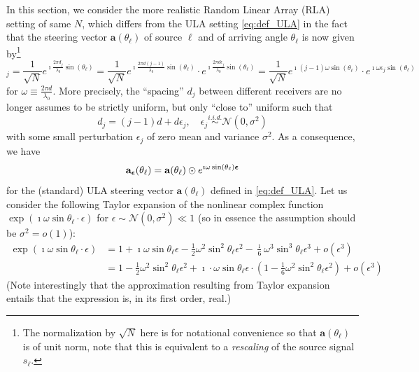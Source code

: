 \documentclass[11pt,a4paper]{article}
\begin{document}
In this section, we consider the more realistic Random Linear Array (RLA) setting of same $N$, which differs from the ULA setting \eqref{eq:def_ULA} in the fact that the steering vector $\mathbf{a}(\theta_\ell)$ of source $\ell$ and of arriving angle $\theta_\ell$ is now given by\footnote{The normalization by $\sqrt N$ here is for notational convenience so that $\mathbf{a}(\theta_\ell)$ is of unit norm, note that this is equivalent to a \emph{rescaling} of the source signal $s_\ell$.}
\begin{equation}
	[\mathbf{a}_{\bepsilon}(\theta_\ell)]_j = \frac1{\sqrt N} e^{\imath \frac{2\pi d_j}{\lambda_0} \sin(\theta_\ell)} = \frac1{\sqrt N} e^{\imath \frac{2\pi d (j-1)}{\lambda_0} \sin(\theta_\ell)} \cdot e^{\imath \frac{2\pi d \epsilon_j}{\lambda_0} \sin(\theta_\ell)} = \frac1{\sqrt N} e^{\imath (j-1) \omega \sin(\theta_\ell)} \cdot e^{\imath \omega \epsilon_j \sin(\theta_\ell)}
\end{equation}
for $\omega \equiv \frac{2 \pi d }{\lambda_0}$.
More precisely, the ``spacing'' $d_j$ between different receivers are no longer assumes to be strictly uniform, but only ``close to'' uniform such that
\begin{equation}
	d_j = (j-1) d + d \epsilon_j, \quad \epsilon_j \overset{i.i.d.}{\sim} \mathcal N(0, \sigma^2)
\end{equation}
with some small perturbation $\epsilon_j$ of zero mean and variance $\sigma^2$. As a consequence, we have
\begin{equation}
	\mathbf{a}_{{\boldsymbol{\epsilon}}}(\theta_\ell) = \mathbf{a}(\theta_\ell) \odot e^{\imath \omega \sin(\theta_\ell) {\boldsymbol{\epsilon}} }
\end{equation}
for the (standard) ULA steering vector $\mathbf{a}(\theta_\ell)$ defined in \eqref{eq:def_ULA}. Let us consider the following Taylor expansion of the nonlinear complex function $\exp(\imath \omega \sin \theta_\ell \cdot \epsilon )$ for $\epsilon \sim \mathcal N(0, \sigma^2) \ll 1$ (so in essence the assumption should be $\sigma^2  = o(1)$):
\begin{align}
	\exp(\imath \omega \sin \theta_\ell \cdot \epsilon ) &= 1 + \imath \omega \sin \theta_\ell \epsilon - \frac12 \omega^2 \sin^2 \theta_\ell \epsilon^2 - \frac{\imath}6 \omega^3 \sin^3 \theta_\ell \epsilon^3 + o(\epsilon^3) \\ 
	&= 1 - \frac12 \omega^2 \sin^2 \theta_\ell \epsilon^2 + \imath \cdot \omega \sin \theta_\ell \epsilon \cdot \left( 1 - \frac16 \omega^2 \sin^2 \theta_\ell \epsilon^2 \right) + o(\epsilon^3)
\end{align}
(Note interestingly that the approximation resulting from Taylor expansion entails that the expression is, in its first order, real.)
\end{document}
